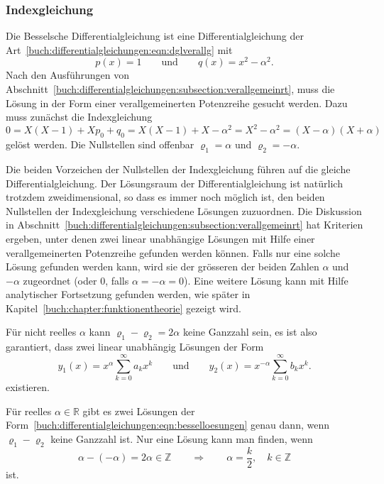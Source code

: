 %
%
\subsubsection{Indexgleichung}
Die Besselsche Differentialgleichung ist eine Differentialgleichung
der Art~\eqref{buch:differentialgleichungen:eqn:dglverallg} mit
\[
p(x) = 1
\qquad\text{und}\qquad
q(x) = x^2-\alpha^2.
\]
Nach den Ausführungen von
Abschnitt~\ref{buch:differentialgleichungen:subsection:verallgemeinrt},
muss die Lösung in der Form einer verallgemeinerten Potenzreihe 
gesucht werden.
Dazu muss zunächst die Indexgleichung
\[
0
=
X(X-1) + Xp_0 + q_0
=
X(X-1) + X - \alpha^2
=
X^2-\alpha^2
=
(X-\alpha)(X+\alpha)
\]
gelöst werden.
Die Nullstellen sind offenbar $\varrho_1=\alpha$ und $\varrho_2=-\alpha$.

Die beiden Vorzeichen der Nullstellen der Indexgleichung führen
auf die gleiche Differentialgleichung.
Der Lösungsraum der Differentialgleichung ist natürlich trotzdem
zweidimensional, so dass es immer noch möglich ist, den
beiden Nullstellen der Indexgleichung verschiedene Lösungen
zuzuordnen.
Die Diskussion in
Abschnitt~\ref{buch:differentialgleichungen:subsection:verallgemeinrt}
hat Kriterien ergeben, unter denen zwei linear unabhängige Lösungen
mit Hilfe einer verallgemeinerten Potenzreihe gefunden werden können.
Falls nur eine solche Lösung gefunden werden kann, wird sie der grösseren
der beiden Zahlen $\alpha$ und $-\alpha$ zugeordnet
(oder $0$, falls $\alpha=-\alpha=0$).
Eine weitere Lösung kann mit Hilfe analytischer Fortsetzung gefunden werden,
wie später in Kapitel~\ref{buch:chapter:funktionentheorie} gezeigt wird.

Für nicht reelles $\alpha$ kann $\varrho_1-\varrho_2=2\alpha$ keine 
Ganzzahl sein, es ist also garantiert, dass zwei linear unabhängig
Lösungen der Form
\begin{equation}
y_1(x) = x^\alpha\sum_{k=0}^\infty a_kx^k
\qquad\text{und}\qquad
y_2(x) = x^{-\alpha}\sum_{k=0}^\infty b_kx^k.
\label{buch:differentialgleichungen:eqn:besselloesungen}
\end{equation}
existieren.

Für reelles $\alpha\in\mathbb{R}$ gibt es zwei Lösungen der
Form~\eqref{buch:differentialgleichungen:eqn:besselloesungen}
genau dann, wenn $\varrho_1-\varrho_2$ keine Ganzzahl ist.
Nur eine Lösung kann man finden, wenn 
\[
\alpha-(-\alpha)=2\alpha \in \mathbb{Z}
\qquad\Rightarrow\qquad
\alpha = \frac{k}{2},\quad k\in\mathbb{Z}
\]
ist.

%
%
